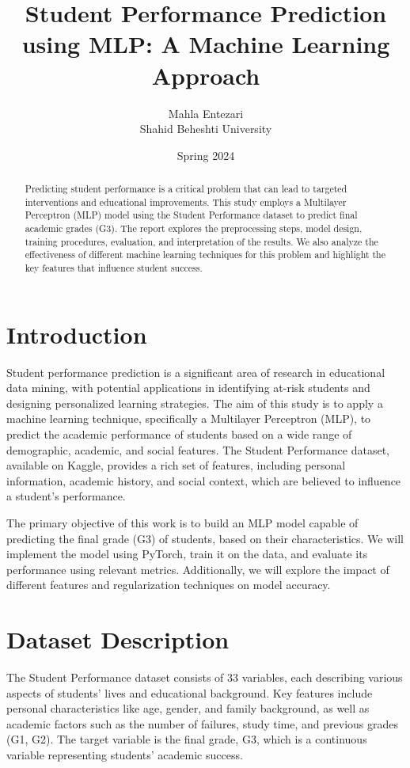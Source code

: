 \documentclass[a4paper,12pt]{article}
\title{Student Performance Prediction using MLP: A Machine Learning Approach}
\author{Mahla Entezari \\ Shahid Beheshti University}
\date{Spring 2024}
\begin{document}
\maketitle

\begin{abstract}
    Predicting student performance is a critical problem that can lead to targeted interventions and educational improvements. This study employs a Multilayer Perceptron (MLP) model using the Student Performance dataset to predict final academic grades (G3). The report explores the preprocessing steps, model design, training procedures, evaluation, and interpretation of the results. We also analyze the effectiveness of different machine learning techniques for this problem and highlight the key features that influence student success.
\end{abstract}

\section{Introduction}
Student performance prediction is a significant area of research in educational data mining, with potential applications in identifying at-risk students and designing personalized learning strategies. The aim of this study is to apply a machine learning technique, specifically a Multilayer Perceptron (MLP), to predict the academic performance of students based on a wide range of demographic, academic, and social features. The Student Performance dataset, available on Kaggle, provides a rich set of features, including personal information, academic history, and social context, which are believed to influence a student's performance.

The primary objective of this work is to build an MLP model capable of predicting the final grade (G3) of students, based on their characteristics. We will implement the model using PyTorch, train it on the data, and evaluate its performance using relevant metrics. Additionally, we will explore the impact of different features and regularization techniques on model accuracy.

\section{Dataset Description}
The Student Performance dataset consists of 33 variables, each describing various aspects of students' lives and educational background. Key features include personal characteristics like age, gender, and family background, as well as academic factors such as the number of failures, study time, and previous grades (G1, G2). The target variable is the final grade, G3, which is a continuous variable representing students' academic success.
\end{document}
